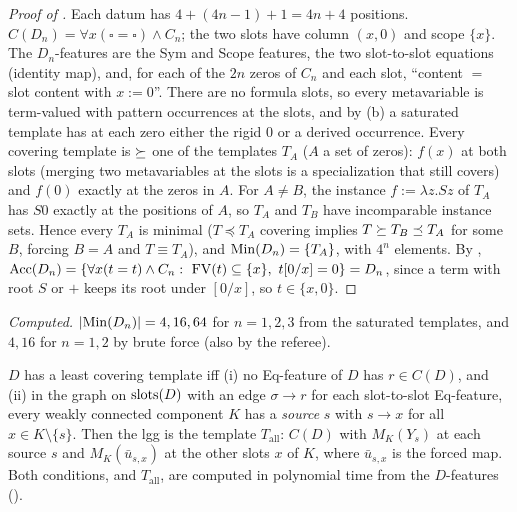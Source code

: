 \begin{proof}[Proof of ]
Each datum has $4+(4n-1)+1=4n+4$ positions. $C(D_n)=\forall x(\square=\square)\wedge C_n$; the two slots have column $(x,0)$ and scope $\{x\}$. The $D_n$-features are the Sym and Scope features, the two slot-to-slot equations (identity map), and, for each of the $2n$ zeros of $C_n$ and each slot, ``content $=$ slot content with $x:=0$''. There are no formula slots, so every metavariable is term-valued with pattern occurrences at the slots, and by (b) a saturated template has at each zero either the rigid $0$ or a derived occurrence. Every covering template is $\succeq$ one of the templates $T_A$ ($A$ a set of zeros): $f(x)$ at both slots (merging two metavariables at the slots is a specialization that still covers) and $f(0)$ exactly at the zeros in $A$. For $A\neq B$, the instance $f:=\lambda z.Sz$ of $T_A$ has $S0$ exactly at the positions of $A$, so $T_A$ and $T_B$ have incomparable instance sets. Hence every $T_A$ is minimal ($T\preceq T_A$ covering implies $T\succeq T_B\preceq T_A$ for some $B$, forcing $B=A$ and $T\equiv T_A$), and $\mathrm{Min}(D_n)=\{T_A\}$, with $4^n$ elements. By , $\mathrm{Acc}(D_n)=\{\forall x(t=t)\wedge C_n:\ \mathrm{FV}(t)\subseteq\{x\},\ t[0/x]=0\}=D_n$, since a term with root $S$ or $+$ keeps its root under $[0/x]$, so $t\in\{x,0\}$.
\end{proof}

\noindent\emph{Computed.} $|\mathrm{Min}(D_n)|=4,16,64$ for $n=1,2,3$ from the saturated templates, and $4,16$ for $n=1,2$ by brute force (also by the referee).

\begin{proposition}\label{prop:single:lgg}
$D$ has a least covering template iff (i) no Eq-feature of $D$ has $r\in C(D)$, and (ii) in the graph on $\mathrm{slots}(D)$ with an edge $\sigma\to r$ for each slot-to-slot Eq-feature, every weakly connected component $K$ has a \emph{source} $s$ with $s\to x$ for all $x\in K\setminus\{s\}$. Then the lgg is the template $T_{\mathrm{all}}$: $C(D)$ with $M_K(Y_s)$ at each source $s$ and $M_K(\bar u_{s,x})$ at the other slots $x$ of $K$, where $\bar u_{s,x}$ is the forced map. Both conditions, and $T_{\mathrm{all}}$, are computed in polynomial time from the $D$-features ().
\end{proposition}

